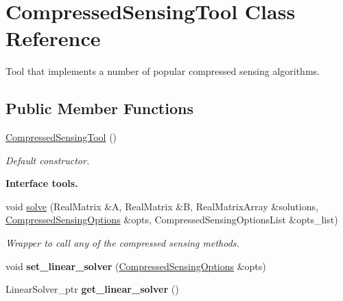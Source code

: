 \section{Compressed\+Sensing\+Tool Class Reference}
\label{classPecos_1_1CompressedSensingTool}


Tool that implements a number of popular compressed sensing algorithms.  


\subsection*{Public Member Functions}
\begin{DoxyCompactItemize}
\item 
\hyperlink{classPecos_1_1CompressedSensingTool_a91459f946e396f732cda23cdcd100da4}{Compressed\+Sensing\+Tool} ()\label{classPecos_1_1CompressedSensingTool_a91459f946e396f732cda23cdcd100da4}

\begin{DoxyCompactList}\small\item\em Default constructor. \end{DoxyCompactList}\end{DoxyCompactItemize}
\begin{Indent}{\bf Interface tools.}\par
\begin{DoxyCompactItemize}
\item 
void \hyperlink{classPecos_1_1CompressedSensingTool_a0592765825357e99967a93c209e819b8}{solve} (Real\+Matrix \&A, Real\+Matrix \&B, Real\+Matrix\+Array \&solutions, \hyperlink{classPecos_1_1CompressedSensingOptions}{Compressed\+Sensing\+Options} \&opts, Compressed\+Sensing\+Options\+List \&opts\+\_\+list)
\begin{DoxyCompactList}\small\item\em Wrapper to call any of the compressed sensing methods. \end{DoxyCompactList}\item 
void {\bfseries set\+\_\+linear\+\_\+solver} (\hyperlink{classPecos_1_1CompressedSensingOptions}{Compressed\+Sensing\+Options} \&opts)\label{classPecos_1_1CompressedSensingTool_a48546251ce1a9161e5466558a194df7a}

\item 
Linear\+Solver\+\_\+ptr {\bfseries get\+\_\+linear\+\_\+solver} ()\label{classPecos_1_1CompressedSensingTool_a321ce094268110552afd01e28c310bc5}

\end{DoxyCompactItemize}
\end{Indent}
